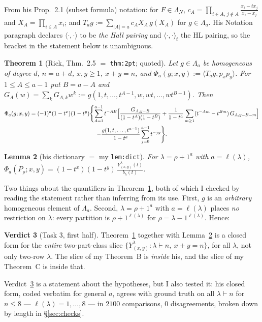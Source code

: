 \documentclass[11pt]{article}
\newtheorem{theorem}{Theorem}
\newtheorem{lemma}[theorem]{Lemma}
\theoremstyle{definition}
\newtheorem{verdict}[theorem]{Verdict}
\newcommand{\lam}{\lambda}
\begin{document}
From his Prop.~2.1 (subset formula) notation: for $F\in\Lambda_N$,
$c_A=\prod_{i\in A,\,j\notin A}\frac{x_i-tx_j}{x_i-x_j}$ and $X_A=\prod_{i\in A}x_i$; and
$T_ag:=\sum_{|A|=a}c_A X_A\,g(X_A)$ for $g\in\Lambda_a$. His Notation paragraph declares
$\langle\cdot,\cdot\rangle$ to be \emph{the Hall pairing} and $\langle\cdot,\cdot\rangle_t$ the HL
pairing, so the bracket in the statement below is unambiguous.

\begin{theorem}[Rick, Thm.~2.5 $=$ \texttt{thm:2pt}; quoted]\label{thm:25}
Let $g\in\Lambda_a$ be homogeneous of degree $d$, $n=a+d$, $x,y\ge1$, $x+y=n$, and
$\Phi_a(g;x,y):=\langle T_ag,p_xp_y\rangle$. For $1\le A\le a-1$ put $B=a-A$ and
$G_A(w)=\sum_kG_{A,k}w^k:=g(1,t,\dots,t^{A-1},w,wt,\dots,wt^{B-1})$. Then
\begin{multline*}
\Phi_a(g;x,y)=(-1)^a(1-t^x)(1-t^y)\Biggl\{\sum_{A=1}^{a-1}t^{-AB}\Bigl[\frac{G_{A,y-B}}{(1-t^A)(1-t^B)}
+\frac{1}{1-t^a}\sum_{m\ge1}(t^{-Am}-t^{Bm})\,G_{A,y-B-m}\Bigr]\\
-\frac{g(1,t,\dots,t^{a-1})}{1-t^a}\sum_{j=0}^{a-1}t^{-jy}\Biggr\}.
\end{multline*}
\end{theorem}

\begin{lemma}[his dictionary $=$ my \texttt{lem:dict}]\label{lem:dict}
For $\lam=\rho+1^a$ with $a=\ell(\lam)$,
$\displaystyle \Phi_a(P_\rho;x,y)=(1-t^x)(1-t^y)\,\frac{Y^{\lam}_{(x,y)}(t)}{b_\lam(t)}$.
\end{lemma}

Two things about the quantifiers in Theorem~\ref{thm:25}, both of which I checked by reading the
statement rather than inferring from its use. First, $g$ is an \emph{arbitrary} homogeneous element
of $\Lambda_a$. Second, $\lam=\rho+1^a$ with $a=\ell(\lam)$ places \emph{no} restriction on $\lam$:
every partition is $\rho+1^{\ell(\lam)}$ for $\rho=\lam-1^{\ell(\lam)}$. Hence:

\begin{verdict}[Task 3, first half]\label{v:slice}
Theorem~\ref{thm:25} together with Lemma~\ref{lem:dict} is a closed form for the \emph{entire}
two-part-class slice $\{Y^\lam_{(x,y)}:\lam\vdash n,\ x+y=n\}$, for all $\lam$, not only two-row
$\lam$. The slice of my Theorem~B is \emph{inside} his, and the slice of my Theorem~C is inside
that.
\end{verdict}

\noindent Verdict~\ref{v:slice} is a statement about the hypotheses, but I also tested it: his
closed form, coded verbatim for general $a$, agrees with ground truth on all $\lam\vdash n$ for
$n\le 8$ --- $\ell(\lam)=1,\dots,8$ --- in $2100$ comparisons, $0$ disagreements, broken down by
length in \S\ref{sec:checks}.
\end{document}
